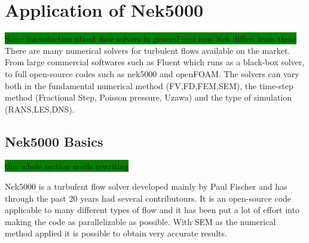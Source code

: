 
\chapter{Application of Nek5000} %

\label{nek} %


\colorbox{green}{Some introduction about flow solvers in general and how Nek differs from these}
There are many numerical solvers for turbulent flows available on the market.
From large commercial softwares such as Fluent which runs as a 
black-box solver, to full open-source codes such as nek5000 and openFOAM. 
The solvers can vary both in the fundamental numerical method (FV,FD,FEM,SEM), 
the time-step method (Fractional Step, Poisson pressure, Uzawa) 
and the type of simulation (RANS,LES,DNS).


\section{Nek5000 Basics}
\colorbox{green}{this whole section needs rewriting}

Nek5000 is a turbulent flow solver developed mainly by Paul Fischer
and has through the past 20 years had several contributours. 
It is an open-source code applicable to many different types of flow 
and it has been put a lot of effort into making the code as parallelizable as possible.
With SEM as the numerical method applied it is possible to obtain very accurate results.  


